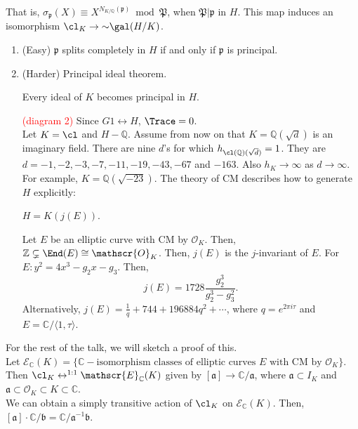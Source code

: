 That is, $\sigma_{\mathfrak{p}}(X) \equiv X^{N_{K/\mathbb{Q}}(\mathfrak{p})} \bmod{\mathfrak{P}}$, when $\mathfrak{P}|\mathfrak{p}$ in $H$.  This map induces an isomorphism $\cl_{K} \to{\sim} \gal(H/K)$.
\begin{remarks}
\begin{enumerate}[label=(\arabic{enumi})]
\item (Easy) $\mathfrak{p}$ splits completely in $H$ if and only if $\mathfrak{p}$ is principal.
\item (Harder) Principal ideal theorem.
\begin{theorem}
Every ideal of $K$ becomes principal in $H$.
\end{theorem}
\textcolor{red}{(diagram 2)}
Since $G{1} \leftrightarrow H$, $\Trace=0$.\\
\indent Let $K=\cl$ and $H-\mathbb{Q}$.  Assume from now on that $K=\mathbb{Q}(\sqrt{d})$ is an imaginary field.  There are nine $d$'s for which $h_{\cl(\mathbb{Q})(\sqrt{d})}=1$.  They are $d=-1,-2,-3,-7,-11,-19,-43,-67$ and $-163$.  Also $h_{K} \to \infty$ as $d \to \infty$.\\
\indent For example, $K=\mathbb{Q}(\sqrt{-23})$.  The theory of CM describes how to generate $H$ explicitly:
\begin{theorem}
$H=K(j(E))$.
\end{theorem}
Let $E$ be an elliptic curve with CM by $\mathscr{O}_{K}$.  Then, $\mathbb{Z} \subsetneq \End(E) \cong \mathscr{O}_{K}$.  Then, $j(E)$ is the $j$-invariant of $E$.  For $E:y^{2}=4x^{3}-g_{2}x-g_{3}$.  Then,
\begin{equation*}
j(E)=1728\frac{g_{2}^{3}}{g_{2}^{3}-g_{3}^{2}}.
\end{equation*}
Alternatively, $j(E)= \frac{1}{q}+744+196884q^{2}+\dotsb$, where $q=e^{2\pi i\tau}$ and $E=\mathbb{C}/\langle 1,\tau \rangle$.
\end{enumerate}
\end{remarks}
\indent For the rest of the talk, we will sketch a proof of this.\\
\indent Let $\mathscr{E}_{\mathbb{C}}(K)=\{\mathbb{C}-\text{isomorphism classes of elliptic curves } E \text{ with  CM by } \mathscr{O}_{K}\}$.  Then $\cl_{K} \leftrightarrow^{1:1} \mathscr{E}_{\mathbb{C}}(K)$ given by $[\mathfrak{a}] \to \mathbb{C}/\mathfrak{a}$, where $\mathfrak{a} \subset I_{K}$ and $\mathfrak{a} \subset \mathscr{O}_{K} \subset K \subset \mathbb{C}$.\\
\indent We can obtain a simply transitive action of $\cl_{K}$ on $\mathscr{E}_{\mathbb{C}}(K)$.  Then, $[\mathfrak{a}]\cdot \mathbb{C}/\mathfrak{b}=\mathbb{C}/\mathfrak{a}^{-1}\mathfrak{b}$.\\
